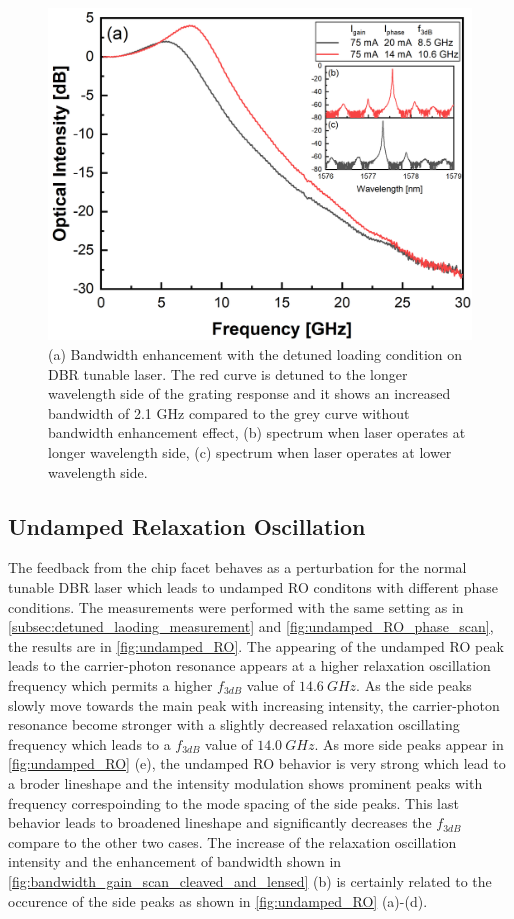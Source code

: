 \begin{figure}[ht]
    \centering
    \includegraphics[width=.7\linewidth]{figures/detuned_loading.png}
    \caption{(a) Bandwidth enhancement with the detuned loading condition on DBR tunable laser. The red curve is detuned to the longer wavelength side of the grating response and it shows an increased bandwidth of 2.1 GHz compared to the grey curve without bandwidth enhancement effect, (b) spectrum when laser operates at longer wavelength side, (c) spectrum when laser operates at lower wavelength side.}
    \label{fig:detuned_loading}
\end{figure}

\subsection{Undamped Relaxation Oscillation}\label{subsec:undamped_RO_measurement}
The feedback from the chip facet behaves as a perturbation for the normal tunable DBR laser which leads to undamped RO conditons with different phase conditions. The measurements were performed with the same setting as in \autoref{subsec:detuned_laoding_measurement} and \autoref{fig:undamped_RO_phase_scan}, the results are in \autoref{fig:undamped_RO}. The appearing of the undamped RO peak leads to the carrier-photon resonance appears at a higher relaxation oscillation frequency which permits a higher $f_{3dB}$ value of $14.6 \ GHz$. As the side peaks slowly move towards the main peak with increasing intensity, the carrier-photon resonance become stronger with a slightly decreased relaxation oscillating frequency which leads to a $f_{3dB}$ value of $14.0 \ GHz$. As more side peaks appear in \autoref{fig:undamped_RO} (e), the undamped RO behavior is very strong which lead to a broder lineshape and the intensity modulation shows prominent peaks with frequency correspoinding to the mode spacing of the side peaks. This last behavior leads to broadened lineshape and significantly decreases the $f_{3dB}$ compare to the other two cases. The increase of the relaxation oscillation intensity and the enhancement of bandwidth shown in \autoref{fig:bandwidth_gain_scan_cleaved_and_lensed} (b) is certainly related to the occurence of the side peaks as shown in \autoref{fig:undamped_RO} (a)-(d).

